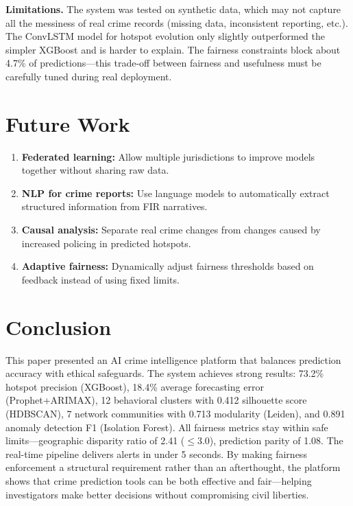 \documentclass[a4paper,10pt,twocolumn]{article}
\begin{document}
\textbf{Limitations.} The system was tested on synthetic data, which may not capture all the messiness of real crime records (missing data, inconsistent reporting, etc.). The ConvLSTM model for hotspot evolution only slightly outperformed the simpler XGBoost and is harder to explain. The fairness constraints block about 4.7\% of predictions---this trade-off between fairness and usefulness must be carefully tuned during real deployment.

\section{Future Work}

\begin{enumerate}
  \item \textbf{Federated learning:} Allow multiple jurisdictions to improve models together without sharing raw data.
  \item \textbf{NLP for crime reports:} Use language models to automatically extract structured information from FIR narratives.
  \item \textbf{Causal analysis:} Separate real crime changes from changes caused by increased policing in predicted hotspots.
  \item \textbf{Adaptive fairness:} Dynamically adjust fairness thresholds based on feedback instead of using fixed limits.
\end{enumerate}

\section{Conclusion}

This paper presented an AI crime intelligence platform that balances prediction accuracy with ethical safeguards. The system achieves strong results: 73.2\% hotspot precision (XGBoost), 18.4\% average forecasting error (Prophet+ARIMAX), 12 behavioral clusters with 0.412 silhouette score (HDBSCAN), 7 network communities with 0.713 modularity (Leiden), and 0.891 anomaly detection F1 (Isolation Forest). All fairness metrics stay within safe limits---geographic disparity ratio of 2.41 ($\leq 3.0$), prediction parity of 1.08. The real-time pipeline delivers alerts in under 5 seconds. By making fairness enforcement a structural requirement rather than an afterthought, the platform shows that crime prediction tools can be both effective and fair---helping investigators make better decisions without compromising civil liberties.
\end{document}
